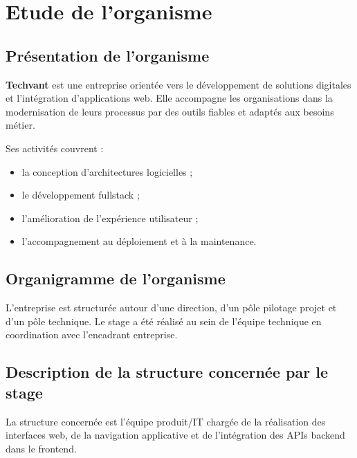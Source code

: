 \chapter{Etude de l'organisme}

\section{Présentation de l'organisme}
\textbf{Techvant} est une entreprise orientée vers le développement de solutions digitales et l'intégration d'applications web. Elle accompagne les organisations dans la modernisation de leurs processus par des outils fiables et adaptés aux besoins métier.

Ses activités couvrent :
\begin{itemize}
	\item la conception d'architectures logicielles ;
	\item le développement fullstack ;
	\item l'amélioration de l'expérience utilisateur ;
	\item l'accompagnement au déploiement et à la maintenance.
\end{itemize}

\section{Organigramme de l'organisme}
L'entreprise est structurée autour d'une direction, d'un pôle pilotage projet et d'un pôle technique. Le stage a été réalisé au sein de l'équipe technique en coordination avec l'encadrant entreprise.

\section{Description de la structure concernée par le stage}
La structure concernée est l'équipe produit/IT chargée de la réalisation des interfaces web, de la navigation applicative et de l'intégration des APIs backend dans le frontend.
